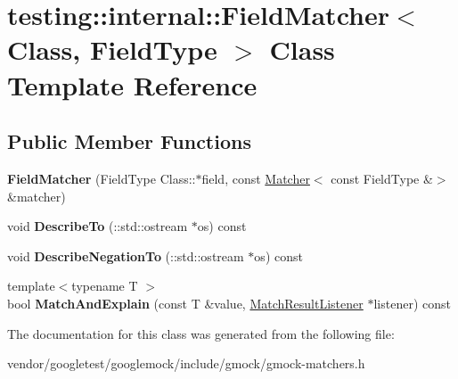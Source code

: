 \hypertarget{classtesting_1_1internal_1_1_field_matcher}{}\section{testing\+:\+:internal\+:\+:Field\+Matcher$<$ Class, Field\+Type $>$ Class Template Reference}
\label{classtesting_1_1internal_1_1_field_matcher}
\subsection*{Public Member Functions}
\begin{DoxyCompactItemize}
\item 
\mbox{\label{classtesting_1_1internal_1_1_field_matcher_a5d20aa34edd41eb898b1f8dd35d585f5}} 
{\bfseries Field\+Matcher} (Field\+Type Class\+::$\ast$field, const \mbox{\hyperlink{classtesting_1_1_matcher}{Matcher}}$<$ const Field\+Type \&$>$ \&matcher)
\item 
\mbox{\label{classtesting_1_1internal_1_1_field_matcher_af0726e67962870bed9f3b184b3edb22e}} 
void {\bfseries Describe\+To} (\+::std\+::ostream $\ast$os) const
\item 
\mbox{\label{classtesting_1_1internal_1_1_field_matcher_a3d8eb433d6a765f8d59b3b07704c3d80}} 
void {\bfseries Describe\+Negation\+To} (\+::std\+::ostream $\ast$os) const
\item 
\mbox{\label{classtesting_1_1internal_1_1_field_matcher_ac0cf950415d64026bc28eb84e6296f1b}} 
{\footnotesize template$<$typename T $>$ }\\bool {\bfseries Match\+And\+Explain} (const T \&value, \mbox{\hyperlink{classtesting_1_1_match_result_listener}{Match\+Result\+Listener}} $\ast$listener) const
\end{DoxyCompactItemize}


The documentation for this class was generated from the following file\+:\begin{DoxyCompactItemize}
\item 
vendor/googletest/googlemock/include/gmock/gmock-\/matchers.\+h\end{DoxyCompactItemize}
